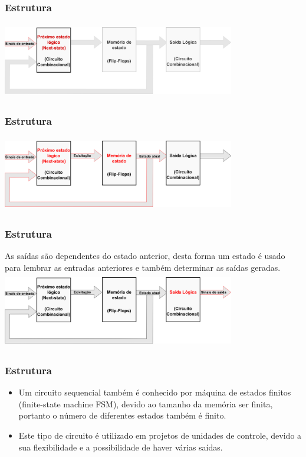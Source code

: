 \documentclass{beamer}
\begin{document}
  \begin{frame}
    \frametitle{Estrutura}
    \includegraphics[height=1.3in, width=4in]{modelo_1.png}
  \end{frame}

  \begin{frame}
    \frametitle{Estrutura}
    \includegraphics[height = 1.3in, width = 4in]{modelo_2.png}
  \end{frame}

  \begin{frame}
    \frametitle{Estrutura}
    As saídas são dependentes do estado anterior, desta forma um estado é usado para lembrar as entradas anteriores e também determinar as saídas geradas. 
    \includegraphics[height = 1.3in, width = 4in]{modelo_3.png}
  \end{frame}

  \begin{frame}
    \frametitle{Estrutura}
    \begin{itemize}
      \item Um circuito sequencial também é conhecido por máquina de estados finitos (finite-state machine FSM), devido ao tamanho da memória ser finita, 
	    portanto o número de diferentes estados também é finito.\pause
      \item Este tipo de circuito é utilizado em projetos de unidades de controle, devido a sua flexibilidade e a possibilidade de haver várias saídas.
    \end{itemize}
  \end{frame}
\end{document}
